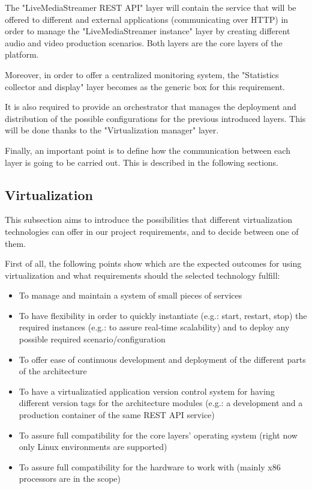 The "LiveMediaStreamer REST API" layer will contain the service that will be offered to different and external applications (communicating over HTTP) in order to manage the "LiveMediaStreamer instance" layer by creating different audio and video production scenarios. Both layers are the core layers of the platform. 

Moreover, in order to offer a centralized monitoring system, the "Statistics collector and display" layer becomes as the generic box for this requirement.

It is also required to provide an orchestrator that manages the deployment and distribution of the possible configurations for the previous introduced layers. This will be done thanks to the "Virtualization manager" layer.

Finally, an important point is to define how the communication between each layer is going to be carried out. This is described in the following sections.

\subsection{Virtualization}

This subsection aims to introduce the possibilities that different virtualization technologies can offer in our project requirements, and to decide between one of them.

First of all, the following points show which are the expected outcomes for using virtualization and what requirements should the selected technology fulfill:

\begin{itemize}
\item To manage and maintain a system of small pieces of services
\item To have flexibility in order to quickly instantiate (e.g.: start, restart, stop) the required instances (e.g.: to assure real-time scalability) and to deploy any possible required scenario/configuration
\item To offer ease of continuous development and deployment of the different parts of the architecture
\item To have a virtualizatied application version control system for having different version tags for the architecture modules (e.g.: a development and a production container of the same REST API service)
\item To assure full compatibility for the core layers' operating system (right now only Linux environments are supported)
\item To assure full compatibility for the hardware to work with (mainly x86 processors are in the scope)
\end{itemize}


